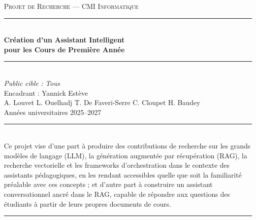 \documentclass[a4paper,11pt]{article}
\begin{document}
\thispagestyle{empty}

\vspace*{3cm}

\begin{center}
    {\small\scshape Projet de Recherche --- CMI Informatique}\\[1cm]
    {\rule{\linewidth}{0.4pt}}\\[0.6cm]
    {\LARGE\bfseries Création d'un Assistant Intelligent\\[0.3cm]pour les Cours de Première Année}\\[0.6cm]
    {\rule{\linewidth}{0.4pt}}\\[1.2cm]
    {\normalsize\itshape Public cible : Tous}\\[0.4cm]
    {\normalsize Encadrant : Yannick Estève}\\[2.5cm]
    {\normalsize
        A. Louvet \quad L. Ouelhadj \quad T. De Faveri-Serre \quad C. Cloupet \quad H. Baudey
    }\\[0.8cm]
    {\small Années universitaires 2025--2027}
\end{center}

\vfill

\begin{center}
\noindent\rule{0.5\linewidth}{0.4pt}\\[0.5cm]
{\small
Ce projet vise d'une part à produire des contributions de recherche sur les
grands modèles de langage (LLM), la génération augmentée par récupération
(RAG), la recherche vectorielle et les frameworks d'orchestration dans le
contexte des assistants pédagogiques, en les rendant accessibles quelle que
soit la familiarité préalable avec ces concepts ; et d'autre part à
construire un assistant conversationnel ancré dans le RAG, capable de
répondre aux questions des étudiants à partir de leurs propres documents de
cours.
}\\[0.4cm]
\noindent\rule{0.5\linewidth}{0.4pt}
\end{center}

\vspace{2cm}


\newpage
\tableofcontents

\end{document}
